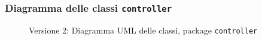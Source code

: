 \subsubsection{Diagramma delle classi \texttt{controller}}
\vspace{0.5cm}
\begin{figure}[H]
    \centering
    \caption{Versione 2: Diagramma UML delle classi, package \texttt{controller}}
    \label{fig:class_controller_v_2}
\end{figure}